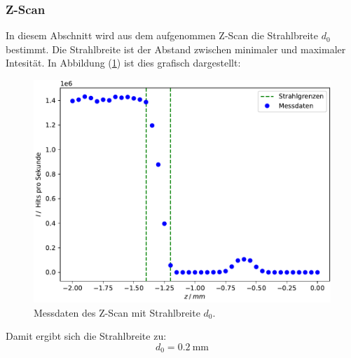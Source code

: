 \subsubsection{Z-Scan}
In diesem Abschnitt wird aus dem aufgenommen Z-Scan die Strahlbreite $d_\mathrm{0}$ bestimmt. Die Strahlbreite ist der Abstand zwischen minimaler und maximaler Intesität. In Abbildung (\ref{fig:zscan}) ist dies grafisch dargestellt:
\begin{figure}[h!]
  \centering
  \includegraphics[scale=0.7]{fig/plot_zscan.pdf}
  \caption{Messdaten des Z-Scan mit Strahlbreite $d_\mathrm{0}$.}
  \label{fig:zscan}
\end{figure}
\FloatBarrier
\noindent Damit ergibt sich die Strahlbreite zu:
\begin{equation*}
  d_\mathrm{0}=\SI{0.2}{\milli\meter}
\end{equation*}
